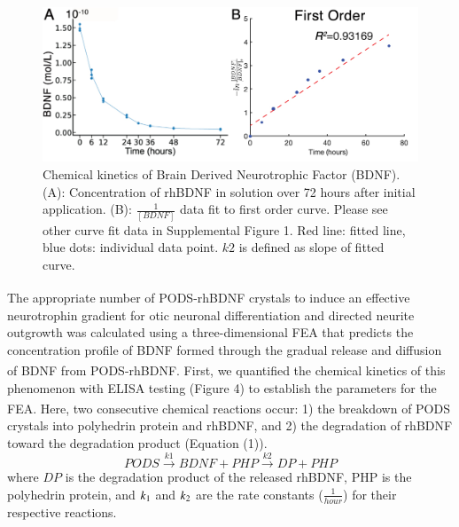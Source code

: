 \documentclass[review]{elsarticle}
\begin{document}
\begin{figure}
	\begin{center}
		\includegraphics[width=12.5cm]{Fig_4.jpg}
	\end{center}
	\caption{Chemical kinetics of Brain Derived Neurotrophic Factor (BDNF). (A): Concentration of rhBDNF in solution over 72 hours after initial application. (B): $\frac{1}{[BDNF]}$ data fit to first order curve. Please see other curve fit data in Supplemental Figure 1. Red line: fitted line, blue dots: individual data point. $k2$ is defined as slope of fitted curve.} 
\end{figure}

\indent The appropriate number of PODS\textsuperscript{\textregistered}-rhBDNF crystals to induce an effective neurotrophin gradient for otic neuronal differentiation and directed neurite outgrowth was calculated using a three-dimensional FEA that predicts the concentration profile of BDNF formed through the gradual release and diffusion of BDNF from PODS\textsuperscript{\textregistered}-rhBDNF. First, we quantified the chemical kinetics of this phenomenon with ELISA testing (Figure 4) to establish the parameters for the FEA. Here, two consecutive chemical reactions occur: 1) the breakdown of PODS\textsuperscript{\textregistered} crystals into polyhedrin protein and rhBDNF, and 2) the degradation of rhBDNF toward the degradation product (Equation (1)).
\begin{equation}
	PODS\overset{k1}{\longrightarrow}BDNF + PHP\overset{k2}{\longrightarrow}DP + PHP
\end{equation}
where $DP$ is the degradation product of the released rhBDNF, PHP is the polyhedrin protein, and $k\textsubscript{1}$ and $k\textsubscript{2}$ are the rate constants ($\frac{1}{hour}$) for their respective reactions.
\end{document}
